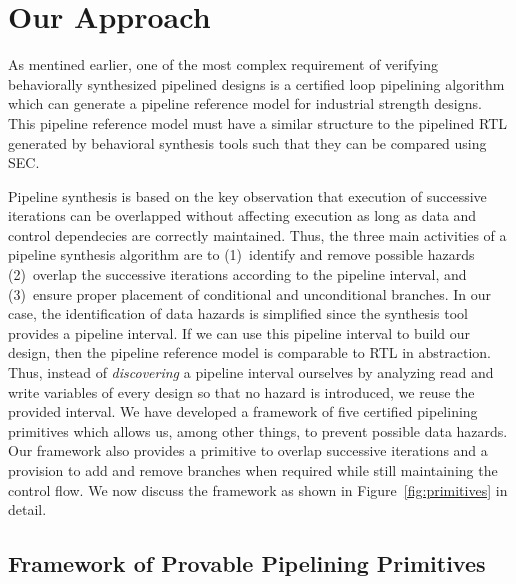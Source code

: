 \chapter{Our Approach}
\label{sec:pipelining-algorithm}

As mentined earlier, one of the most complex requirement of 
verifying behaviorally synthesized pipelined designs is a certified loop
pipelining algorithm which can generate a pipeline reference model
for industrial strength designs. This pipeline reference model must have a similar structure to the pipelined RTL generated by behavioral synthesis tools such that they can be compared using SEC. 
  
Pipeline synthesis is based on the key observation that
execution of successive iterations can be overlapped without affecting 
execution as long
as data and control dependecies are correctly maintained. 
Thus, the three main
activities of a pipeline synthesis algorithm are to
(1)~identify and remove possible hazards (2)~overlap the
successive iterations according to the pipeline interval, and (3)~ensure proper placement of conditional and unconditional branches. In our case,
the identification of data hazards is simplified since the synthesis tool
provides a pipeline interval. If we can use this pipeline interval to build our design, then the pipeline reference model is comparable to RTL in abstraction. Thus, instead of {\em
discovering} a pipeline interval ourselves by analyzing read and write variables of every design so that no
hazard is introduced, we reuse the provided interval. 
We have developed a framework of five certified pipelining
primitives which allows us, among other things, to prevent possible data
hazards. Our framework also provides a primitive
to overlap successive iterations and a provision to add and remove branches when required while still maintaining the control flow. We now discuss
the framework as shown in Figure~\ref{fig:primitives}  in detail.

\section{Framework of Provable Pipelining Primitives}

